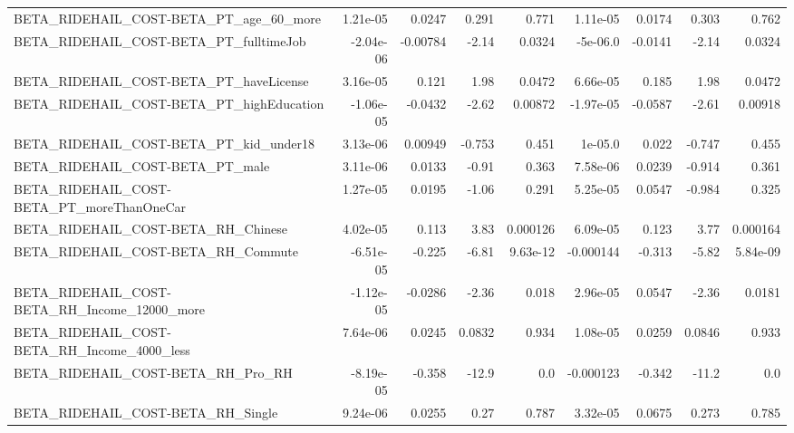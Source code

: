 \begin{tabular}{lrrrrrrrr}
BETA\_RIDEHAIL\_COST-BETA\_PT\_age\_60\_more             &    1.21e-05 &       0.0247 &     0.291 &    0.771 &   1.11e-05 &      0.0174 &        0.303 &         0.762 \\
BETA\_RIDEHAIL\_COST-BETA\_PT\_fulltimeJob             &   -2.04e-06 &     -0.00784 &     -2.14 &   0.0324 &   -5e-06.0 &     -0.0141 &        -2.14 &        0.0324 \\
BETA\_RIDEHAIL\_COST-BETA\_PT\_haveLicense             &    3.16e-05 &        0.121 &      1.98 &   0.0472 &   6.66e-05 &       0.185 &         1.98 &        0.0472 \\
BETA\_RIDEHAIL\_COST-BETA\_PT\_highEducation           &   -1.06e-05 &      -0.0432 &     -2.62 &  0.00872 &  -1.97e-05 &     -0.0587 &        -2.61 &       0.00918 \\
BETA\_RIDEHAIL\_COST-BETA\_PT\_kid\_under18             &    3.13e-06 &      0.00949 &    -0.753 &    0.451 &    1e-05.0 &       0.022 &       -0.747 &         0.455 \\
BETA\_RIDEHAIL\_COST-BETA\_PT\_male                    &    3.11e-06 &       0.0133 &     -0.91 &    0.363 &   7.58e-06 &      0.0239 &       -0.914 &         0.361 \\
BETA\_RIDEHAIL\_COST-BETA\_PT\_moreThanOneCar          &    1.27e-05 &       0.0195 &     -1.06 &    0.291 &   5.25e-05 &      0.0547 &       -0.984 &         0.325 \\
BETA\_RIDEHAIL\_COST-BETA\_RH\_Chinese                 &    4.02e-05 &        0.113 &      3.83 & 0.000126 &   6.09e-05 &       0.123 &         3.77 &      0.000164 \\
BETA\_RIDEHAIL\_COST-BETA\_RH\_Commute                 &   -6.51e-05 &       -0.225 &     -6.81 & 9.63e-12 &  -0.000144 &      -0.313 &        -5.82 &      5.84e-09 \\
BETA\_RIDEHAIL\_COST-BETA\_RH\_Income\_12000\_more       &   -1.12e-05 &      -0.0286 &     -2.36 &    0.018 &   2.96e-05 &      0.0547 &        -2.36 &        0.0181 \\
BETA\_RIDEHAIL\_COST-BETA\_RH\_Income\_4000\_less        &    7.64e-06 &       0.0245 &    0.0832 &    0.934 &   1.08e-05 &      0.0259 &       0.0846 &         0.933 \\
BETA\_RIDEHAIL\_COST-BETA\_RH\_Pro\_RH                  &   -8.19e-05 &       -0.358 &     -12.9 &      0.0 &  -0.000123 &      -0.342 &        -11.2 &           0.0 \\
BETA\_RIDEHAIL\_COST-BETA\_RH\_Single                  &    9.24e-06 &       0.0255 &      0.27 &    0.787 &   3.32e-05 &      0.0675 &        0.273 &         0.785 \\

\end{tabular}
